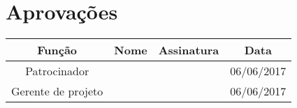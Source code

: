 \section{Aprovações}

\begin{table}[H]
	\begin{tabularx}{\textwidth}{| c | c | X | c |}
		\hline
		\textbf{Função}  & \textbf{Nome}         & \textbf{Assinatura}        & \textbf{Data} \\
		\hline
		Patrocinador       & \projectSponsorName{} & \projectSponsorSignature{} &      06/06/2017         \\
		\hline
		Gerente de projeto & \projectManagerName{} & \projectManagerSignature{} &      06/06/2017         \\
		\hline
	\end{tabularx}
	\centering
\end{table}